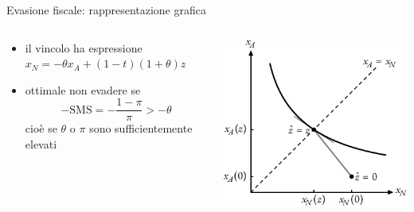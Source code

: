 \documentclass[aspectratio=64,11pt]{beamer}
\begin{document}
\begin{frame}{Evasione fiscale: rappresentazione grafica}
\begin{columns}
\begin{column}{.45\columnwidth}
\begin{itemize}
\item il vincolo ha espressione $x_N=-\theta x_A+(1-t)(1+\theta)z$
\item ottimale non evadere se
$$ -\text{SMS}=-\frac{1-\pi}{\pi} >-\theta $$
cioè se $\theta$ o $\pi$ sono sufficientemente elevati
\end{itemize}
\end{column}
\begin{column}{.55\columnwidth}
\begin{center}
\includegraphics[width=\textwidth]{./figure/evasione-1.pdf}
\end{center}
\end{column}
\end{columns}
\end{frame}
\end{document}

